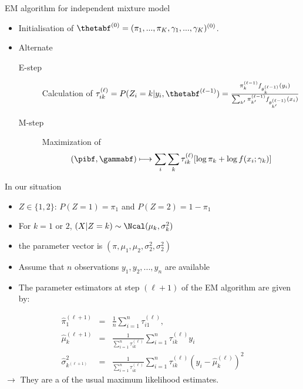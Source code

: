 \begin{frame}{EM algorithm for independent mixture model}
    \begin{itemize}
    \item Initialisation of $\thetabf^{(0)}=(\pi_1, ..., \pi_K, \gamma_1, ..., \gamma_K)^{(0)}$.
  \pause
  \item Alternate  
      \begin{description}
      \item[E-step] Calculation of $\tau^{(\ell)}_{ik}=P(Z_i = k | y_i, \thetabf^{(\ell-1)}) = \frac{\pi^{(\ell-1)}_k f_{\theta^{(\ell-1)}_k}(y_i)}{\sum_{k'} \pi^{(\ell-1)}_{k'}f_{\theta^{(\ell-1)}_{k'}}(x_i)}$

      \item[M-step] Maximization of
        $$
        (\pibf, \gammabf) \longmapsto \sum_i \sum_k \tau_{ik}^{(\ell)} [\log \pi_k +
          \log f(x_i; \gamma_k)]
        $$
      \end{description} 
    \end{itemize}
\end{frame}

\begin{frame}{In our situation}
\begin{itemize}  
\item $Z \in \{1,2\}$: $P(Z=1)=\pi_1$ and $P(Z=2)=1-\pi_1$  
\item For $k=1$ or $2$, $(X|Z=k) \sim \Ncal(\mu_k, \sigma_k^2)$ 
\item the parameter vector is $(\pi, \mu_1, \mu_2, \sigma_2^2, \sigma_2^2)$
\item[] Assume that $n$ observations $y_1, y_2, ..., y_n$ are available
\item The parameter estimators  at step $(\ell+1)$ of the EM algorithm 
are given by:
\end{itemize}
\bigskip
   \begin{eqnarray*}
     \widehat{\pi}_1^{(\ell+1)} & = & \frac1{n} \sum_{i=1}^n \tau_{i1} ^{(\ell)}, \\
     \widehat{\mu}_k^{(\ell+1)} & = & \frac1{\sum_{i=1}^n  \tau_{ik} ^{(\ell)}} \sum_{i=1}^n \tau_{ik}^{(\ell)} y_i \\ 
     \widehat{\sigma}^2_{k^{(\ell+1)}} & = &  \frac1{\sum_{i=1}^n  \tau_{ik} ^{(\ell)}} \sum_{i=1}^n \tau_{ik}^{(\ell)} (y_i - \widehat{\mu}_k^{(\ell)})^2
  \end{eqnarray*}
   $\rightarrow$ They are a  of the usual maximum
   likelihood estimates. 
\end{frame}


